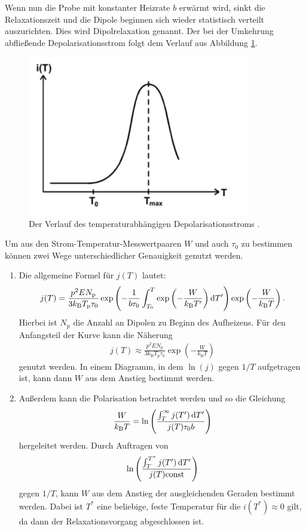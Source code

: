 Wenn nun die Probe mit konstanter Heizrate $b$ erwärmt wird, sinkt die Relaxationszeit und die Dipole beginnen sich wieder statistisch verteilt auszurichten. Dies wird Dipolrelaxation genannt. Der bei der Umkehrung abfließende Depolarisationsstrom folgt dem Verlauf aus Abbildung \ref{fig:stromTemp}.
\begin{figure}
  \centering
  \includegraphics[height= 7cm]{BestNippelpiercings/stromTemp.pdf}
  \caption{Der Verlauf des temperaturabhängigen Depolarisationsstroms \cite{anleitung}.}
  \label{fig:stromTemp}
\end{figure}
Um aus den Strom-Temperatur-Messwertpaaren $W$ und auch $\tau_0$ zu bestimmen können zwei Wege unterschiedlicher Genauigkeit genutzt werden.
\begin{enumerate}
  \item Die allgemeine Formel für $j(T)$ lautet:
    \begin{align}
      j(T) = \frac{p^2 E N_\text{p}}{3k_\text{B} T_\text{p}\tau_0}
      \exp\left(-\frac{1}{b\tau_0} \int_{T_0}^T\exp\left(-\frac{W}{k_\text{B}T'}\right)\mathop{}\!\mathrm{d} T'\right)
      \exp\left(-\frac{W}{k_\text{B}T}\right). \label{eqn:allgjt}
    \end{align}
    Hierbei ist $N_\text{p}$ die Anzahl an Dipolen zu Beginn des Aufheizens.
    Für den Anfangsteil der Kurve kann die Näherung
    \begin{align}
      j(T) \approx \frac{p^2 E N_\text{p}}{3k_\text{B} T_\text{p}\tau_0} \exp\left(-\frac{W}{k_\text{B}T}\right)
      \label{eqn:W1formel}
    \end{align}
    genutzt werden. In einem Diagramm, in dem $\ln(j)$ gegen $1/T$ aufgetragen ist, kann dann $W$ aus dem Anstieg bestimmt werden.
  \item Außerdem kann die Polarisation betrachtet werden und so die Gleichung
    \begin{align}
      \frac{W}{k_\text{B}T} = \ln\left(\frac{\int_{T}^{\infty} j(T')\mathop{}\!\mathrm{d} T'}{j(T)\tau_0 b}\right)
      \label{eqn:W2formel}
    \end{align}
    hergeleitet werden. Durch Auftragen von
    \begin{align*}
      \ln\left(\frac{\int_T^{T^*} j(T')\mathop{}\!\mathrm{d} T'}{j(T) \text{const}}\right)
    \end{align*}
    gegen $1/T$, kann $W$ aus dem Anstieg der ausgleichenden Geraden bestimmt werden. Dabei ist $T^*$ eine beliebige, feste Temperatur für die $i(T^*) \approx 0$ gilt, da dann der Relaxationsvorgang abgeschlossen ist.
\end{enumerate}
